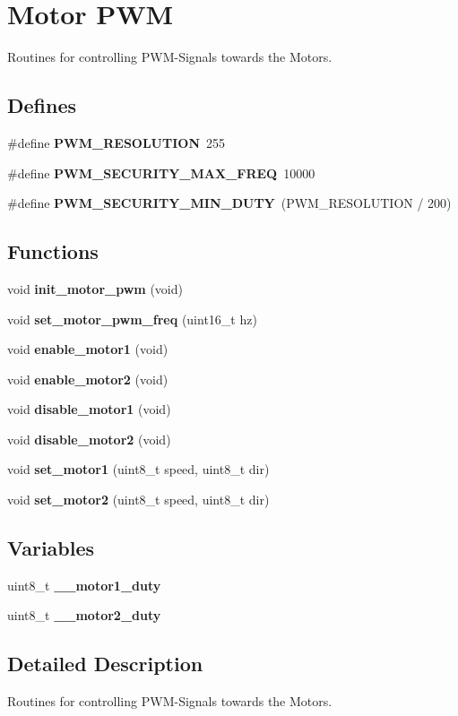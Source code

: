 \section{Motor PWM}
\label{group__ro__motor__pwm}
Routines for controlling PWM-Signals towards the Motors.  
\subsection*{Defines}
\begin{CompactItemize}
\item 
\#define {\bf PWM\_\-RESOLUTION}~255
\item 
\#define {\bf PWM\_\-SECURITY\_\-MAX\_\-FREQ}~10000
\item 
\#define {\bf PWM\_\-SECURITY\_\-MIN\_\-DUTY}~(PWM\_\-RESOLUTION / 200)
\end{CompactItemize}
\subsection*{Functions}
\begin{CompactItemize}
\item 
void {\bf init\_\-motor\_\-pwm} (void)
\item 
void {\bf set\_\-motor\_\-pwm\_\-freq} (uint16\_\-t hz)
\item 
void {\bf enable\_\-motor1} (void)
\item 
void {\bf enable\_\-motor2} (void)
\item 
void {\bf disable\_\-motor1} (void)
\item 
void {\bf disable\_\-motor2} (void)
\item 
void {\bf set\_\-motor1} (uint8\_\-t speed, uint8\_\-t dir)
\item 
void {\bf set\_\-motor2} (uint8\_\-t speed, uint8\_\-t dir)
\end{CompactItemize}
\subsection*{Variables}
\begin{CompactItemize}
\item 
uint8\_\-t {\bf \_\-\_\-motor1\_\-duty}
\item 
uint8\_\-t {\bf \_\-\_\-motor2\_\-duty}
\end{CompactItemize}


\subsection{Detailed Description}
Routines for controlling PWM-Signals towards the Motors. 



